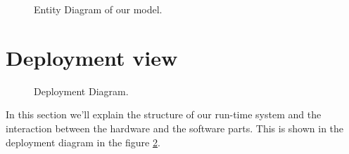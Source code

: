\begin{figure}[H]
  \centering
    \caption{Entity Diagram of our model.}
      \label{entity_Diagram}
\end{figure} 




\section{Deployment view}


\begin{figure}[H]
  \centering
    \caption{Deployment Diagram.}
      \label{fig:deployment}
\end{figure}



In this section we'll explain the structure of our run-time system and the interaction between the hardware and the software parts. This is shown in the deployment diagram in the figure \ref{fig:deployment}. \bigskip

